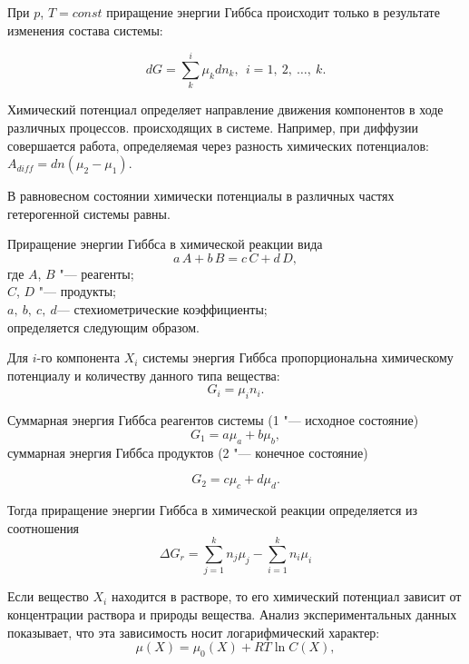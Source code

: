\documentclass[12pt,a4paper,oneside]{book}
\begin{document}
При $p$, $T = const$ приращение энергии Гиббса происходит только в результате изменения состава системы:

\begin{equation}
	dG = \sum_k^i \mu_k dn_k, \  \ i=1,\ 2,\ \dots,\ k.
\end{equation}

Химический потенциал определяет направление движения компонентов в ходе различных процессов. происходящих в системе. Например, при диффузии совершается работа, определяемая через разность химических потенциалов: $A_{diff}=dn(\mu_2-\mu_1)$.

В равновесном состоянии химически потенциалы в различных частях гетерогенной системы равны.

Приращение энергии Гиббса в химической реакции вида
\begin{equation}
	a\,A + b\,B = c\,C + d\,D,
\end{equation}
где $A$, $B$ "--- реагенты;\\
$C$, $D$ "--- продукты;\\
$a,\ b,\ c,\ d$--- стехиометрические коэффициенты;\\
определяется следующим образом.

Для $i$-го компонента $X_i$ системы энергия Гиббса пропорциональна химическому потенциалу и количеству данного типа вещества:
\begin{equation}
	G_i=\mu_i n_i.
\end{equation}
	
Суммарная энергия Гиббса реагентов системы (1 "--- исходное состояние)
\begin{equation}
	G_1=a\mu_a+b\mu_b,
\end{equation}
суммарная энергия Гиббса продуктов (2 "--- конечное состояние)

\begin{equation}
	G_2=c\mu_c+d\mu_d.
\end{equation}

Тогда приращение энергии Гиббса в химической реакции определяется из соотношения
\begin{equation}
	\Delta G_r=\sum_{j=1}^k n_j\mu_j - \sum_{i=1}^k n_i\mu_i
\end{equation}

Если вещество $X_i$ находится в растворе, то его химический потенциал зависит от концентрации раствора и природы вещества. Анализ экспериментальных данных показывает, что эта зависимость носит логарифмический характер:
\begin{equation}
	\mu(X)=\mu_0(X)+RT \ln C(X),
\end{equation}
\end{document}
